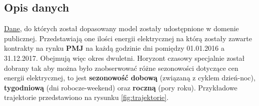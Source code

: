 \documentclass[11pt]{article}
\begin{document}
\subsection{Opis danych}
\href{https://www.kaggle.com/datasets/robikscube/hourly-energy-consumption}{Dane}, do których został dopasowany model zostały udostępnione w domenie publicznej. Przedstawiają one ilości energii elektrycznej na którą zostały zawarte kontrakty na rynku \textbf{PMJ} na każdą godzinie dni pomiędzy 01.01.2016 a 31.12.2017. Obejmują więc okres dwuletni. Horyzont czasowy specjalnie został dobrany tak aby można było zaobserwować różne sezonowości dotyczące cen energii elektrycznej, to jest \textbf{sezonowość dobową} (związaną z cyklem dzień-noc), \textbf{tygodniową} (dni robocze-weekend) oraz \textbf{roczną} (pory roku). Przykładowe trajektorie przedstawiono na rysunku \ref{fig:trajektorie}.
\end{document}
